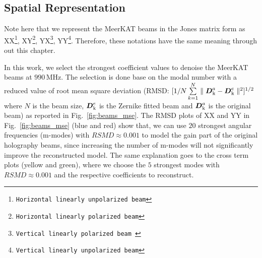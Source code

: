 \subsection{Spatial Representation}	   \label{chap5:spatial}

Note here that we represent the MeerKAT beams in the Jones matrix form as XX\footnote{{\tt Horizontal linearly unpolarized beam}}, XY\footnote{{\tt Horizontal linearly polarized beam}}, YX\footnote{{\tt Vertical linearly polarized beam }}, YY\footnote{{\tt Vertical linearly unpolarized beam}}. Therefore, these notations have the same meaning through out this chapter.

In this work, we select the strongest coefficient values to denoise the MeerKAT beams at $990\, \mathrm{MHz}$. The selection is done base on the modal number with a reduced value of root mean square deviation (RMSD: $[ 1/N \sum\limits_{k=1}^{N} \parallel \boldsymbol{D}_{\rm k}^{a} - \boldsymbol{D}_{\rm k}^{e}\parallel^{2}]^{1/2}$ where $N$ is the beam size, $\boldsymbol{D}_{\rm k}^{e}$ is the Zernike fitted beam and $\boldsymbol{D}_{\rm k}^{a}$ is the original beam) as reported in Fig.~\ref{fig:beams_mse}. The RMSD plots of XX and YY in Fig.~\ref{fig:beams_mse} (blue and red) show that, we can use $20$ strongest angular frequencies (m-modes) with $RSMD \approx 0.001$ to model the gain part of the original holography beams, since increasing the number of m-modes will not significantly improve the reconstructed model. The same explanation goes to the cross term plots (yellow and green), where we choose the $5$ strongest modes with $RSMD \approx 0.001$ and the respective coefficients to reconstruct.

